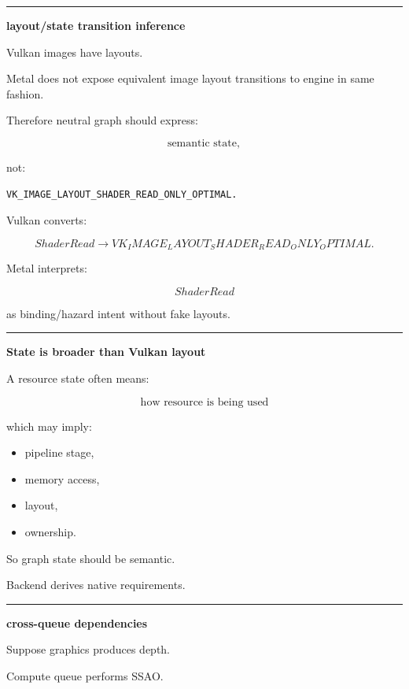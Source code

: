 \begin{center}\rule{0.5\linewidth}{0.5pt}\end{center}

\textbf{layout/state transition inference}

Vulkan images have layouts.

Metal does not expose equivalent image layout transitions to engine in same fashion.

Therefore neutral graph should express:

\[
\text{semantic state},
\]

not:

\begin{verbatim}
VK_IMAGE_LAYOUT_SHADER_READ_ONLY_OPTIMAL.
\end{verbatim}

Vulkan converts:

\[
ShaderRead
\rightarrow
VK_IMAGE_LAYOUT_SHADER_READ_ONLY_OPTIMAL.
\]

Metal interprets:

\[
ShaderRead
\]

as binding/hazard intent without fake layouts.

\begin{center}\rule{0.5\linewidth}{0.5pt}\end{center}

\textbf{State is broader than Vulkan layout}

A resource state often means:

\[
\boxed{
\text{how resource is being used}
}
\]

which may imply:

\begin{itemize}
\tightlist
\item
  pipeline stage,
\item
  memory access,
\item
  layout,
\item
  ownership.
\end{itemize}

So graph state should be semantic.

Backend derives native requirements.

\begin{center}\rule{0.5\linewidth}{0.5pt}\end{center}

\textbf{cross-queue dependencies}

Suppose graphics produces depth.

Compute queue performs SSAO.

